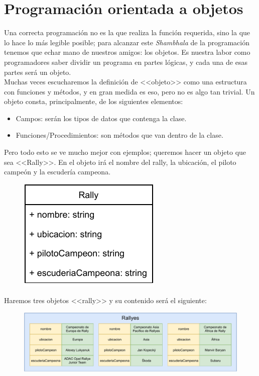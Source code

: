\documentclass[11pt, oneside]{book}		%
\begin{document}
\chapter{Programación orientada a objetos}
Una correcta programación no es la que realiza la función requerida, sino la que lo hace lo más legible posible; para alcanzar este \textit{Shambhala} de la programación tenemos que echar mano de nuestros amigos: los objetos. Es nuestra labor como programadores saber dividir un programa en partes lógicas, y cada una de esas partes será un objeto.\\
Muchas veces escucharemos la definición de <<objeto>> como una estructura con funciones y métodos, y en gran medida es eso, pero no es algo tan trivial. Un objeto consta, principalmente, de los siguientes elementos:
\begin{itemize}
	\item Campos: serán los tipos de datos que contenga la clase.
	\item Funciones/Procedimientos: son métodos que van dentro de la clase.
\end{itemize}
Pero todo esto se ve mucho mejor con ejemplos; queremos hacer un objeto que sea <<Rally>>. En el objeto irá el nombre del rally, la ubicación, el piloto campeón y la escudería campeona.
\begin{figure}[H]
	\centering
	\includegraphics{img/POO/objeto1.pdf}
\end{figure}
Haremos tres objetos <<rally>> y su contenido será el siguiente:
\begin{figure}[H]
	\centering
	\hspace*{-1.5in}\includegraphics{img/POO/conjuntoObjeto.pdf}
\end{figure}
\end{document}
